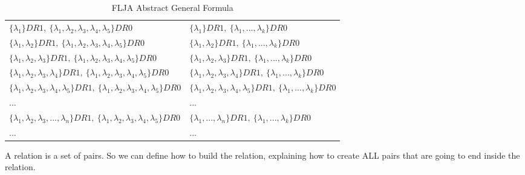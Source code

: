 \begin{table}[h!]
\begin{center}
\begin{tabular}{|l||l|}
						\cellcolor{applegreen!50} & \cellcolor{applegreen!50}  \\
					\hline
					\hline
						$\{\lambda_{1}\}DR1,\:\{\lambda_{1}, \lambda_{2}, \lambda_{3}, \lambda_{4}, \lambda_{5}\}DR0$ &
						$\{\lambda_{1}\}DR1,\:\{\lambda_{1}, ... , \lambda_{k}\}DR0$ \\
						$\{\lambda_{1}, \lambda_{2}\}DR1,\:\{\lambda_{1}, \lambda_{2}, \lambda_{3}, \lambda_{4}, \lambda_{5}\}DR0$ &
						$\{\lambda_{1}, \lambda_{2}\}DR1,\:\{\lambda_{1}, ... , \lambda_{k}\}DR0$ \\
						$\{\lambda_{1}, \lambda_{2}, \lambda_{3}\}DR1,\:\{\lambda_{1}, \lambda_{2}, \lambda_{3}, \lambda_{4}, \lambda_{5}\}DR0$ &
						$\{\lambda_{1}, \lambda_{2}, \lambda_{3}\}DR1,\:\{\lambda_{1}, ... , \lambda_{k}\}DR0$ \\
						$\{\lambda_{1}, \lambda_{2}, \lambda_{3}, \lambda_{4}\}DR1,\:\{\lambda_{1}, \lambda_{2}, \lambda_{3}, \lambda_{4}, \lambda_{5}\}DR0$ &
						$\{\lambda_{1}, \lambda_{2}, \lambda_{3}, \lambda_{4}\}DR1,\:\{\lambda_{1}, ... , \lambda_{k}\}DR0$ \\
						$\{\lambda_{1}, \lambda_{2}, \lambda_{3}, \lambda_{4}, \lambda_{5}\}DR1,\:\{\lambda_{1}, \lambda_{2}, \lambda_{3}, \lambda_{4}, \lambda_{5}\}DR0$ &
						$\{\lambda_{1}, \lambda_{2}, \lambda_{3}, \lambda_{4}, \lambda_{5}\}DR1,\:\{\lambda_{1}, ... , \lambda_{k}\}DR0$ \\
						... & ... \\
						$\{\lambda_{1}, \lambda_{2}, \lambda_{3}, ... , \lambda_{n}\}DR1,\:\{\lambda_{1}, \lambda_{2}, \lambda_{3}, \lambda_{4}, \lambda_{5}\}DR0$ &
						$\{\lambda_{1}, ... , \lambda_{n}\}DR1,\:\{\lambda_{1}, ... , \lambda_{k}\}DR0$ \\
						... & ... \\
					\hline
				\end{tabular}
				\caption{FLJA Abstract General Formula}
				\label{tab:flja_general}
		\end{center}
	\end{table}
	
	\newpage
	\noindent
	A relation is a set of pairs. So we can define how to build the relation, explaining how to create ALL pairs that are going to end inside the relation.
	\\\\
	
